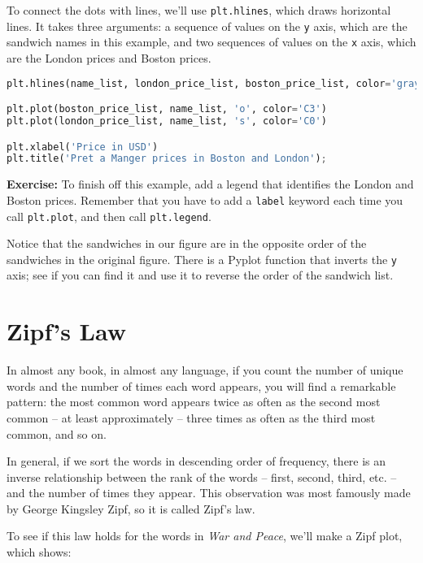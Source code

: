 To connect the dots with lines, we'll use
\passthrough{\lstinline!plt.hlines!}, which draws horizontal lines. It
takes three arguments: a sequence of values on the
\passthrough{\lstinline!y!} axis, which are the sandwich names in this
example, and two sequences of values on the \passthrough{\lstinline!x!}
axis, which are the London prices and Boston prices.

\begin{lstlisting}[language=Python,style=source]
plt.hlines(name_list, london_price_list, boston_price_list, color='gray')

plt.plot(boston_price_list, name_list, 'o', color='C3')
plt.plot(london_price_list, name_list, 's', color='C0')

plt.xlabel('Price in USD')
plt.title('Pret a Manger prices in Boston and London');
\end{lstlisting}

\textbf{Exercise:} To finish off this example, add a legend that
identifies the London and Boston prices. Remember that you have to add a
\passthrough{\lstinline!label!} keyword each time you call
\passthrough{\lstinline!plt.plot!}, and then call
\passthrough{\lstinline!plt.legend!}.

Notice that the sandwiches in our figure are in the opposite order of
the sandwiches in the original figure. There is a Pyplot function that
inverts the \passthrough{\lstinline!y!} axis; see if you can find it and
use it to reverse the order of the sandwich list.

\hypertarget{zipfs-law}{%
\section{Zipf's Law}\label{zipfs-law}}

In almost any book, in almost any language, if you count the number of
unique words and the number of times each word appears, you will find a
remarkable pattern: the most common word appears twice as often as the
second most common -- at least approximately -- three times as often as
the third most common, and so on.

In general, if we sort the words in descending order of frequency, there
is an inverse relationship between the rank of the words -- first,
second, third, etc. -- and the number of times they appear. This
observation was most famously made by George Kingsley Zipf, so it is
called Zipf's law.

To see if this law holds for the words in \emph{War and Peace}, we'll
make a Zipf plot, which shows:

